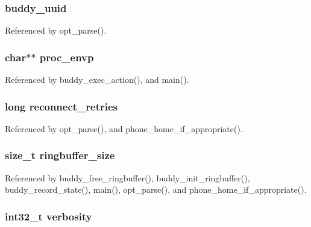 \subsubsection[{buddy\_\-uuid}]{ {\bf buddy\_\-uuid}}\label{buddy_8h_a3e9321d881ca257289c65b5022b693c8}


Referenced by opt\_\-parse().

\subsubsection[{proc\_\-envp}]{\setlength{\rightskip}{0pt plus 5cm}char$\ast$$\ast$ {\bf proc\_\-envp}}\label{buddy_8h_adcfeefdfcc71ba2dc2cddac18f4dcb4d}


Referenced by buddy\_\-exec\_\-action(), and main().

\subsubsection[{reconnect\_\-retries}]{\setlength{\rightskip}{0pt plus 5cm}long {\bf reconnect\_\-retries}}\label{buddy_8h_a5d96c4625ef6fb62b61353fd2766b0d9}


Referenced by opt\_\-parse(), and phone\_\-home\_\-if\_\-appropriate().

\subsubsection[{ringbuffer\_\-size}]{\setlength{\rightskip}{0pt plus 5cm}size\_\-t {\bf ringbuffer\_\-size}}\label{buddy_8h_aaf0b4e8526897974d594cc330ece0b5c}


Referenced by buddy\_\-free\_\-ringbuffer(), buddy\_\-init\_\-ringbuffer(), buddy\_\-record\_\-state(), main(), opt\_\-parse(), and phone\_\-home\_\-if\_\-appropriate().

\subsubsection[{verbosity}]{\setlength{\rightskip}{0pt plus 5cm}int32\_\-t {\bf verbosity}}\label{buddy_8h_ae58239b03e562b412748d74dece0fcc8}

